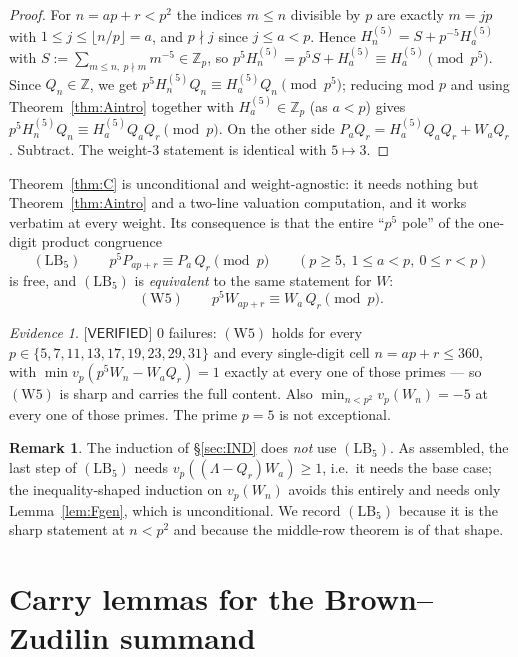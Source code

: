 \documentclass[11pt,reqno]{amsart}
\theoremstyle{plain}
\theoremstyle{definition}
\newtheorem{remark}[theorem]{Remark}
\theoremstyle{remark}
\newtheorem{evidence}[theorem]{Evidence}
\numberwithin{equation}{section}
\newcommand{\ZZ}{\mathbb{Z}}
\newcommand{\Zp}{\ZZ_p}
\newcommand{\VERIFIED}{\textsf{[VERIFIED]}}
\begin{document}
\begin{proof}
For $n=ap+r<p^2$ the indices $m\le n$ divisible by $p$ are exactly $m=jp$ with
$1\le j\le\lfloor n/p\rfloor=a$, and $p\nmid j$ since $j\le a<p$. Hence
$H^{(5)}_n=S+p^{-5}H^{(5)}_a$ with $S:=\sum_{m\le n,\ p\nmid m}m^{-5}\in\Zp$, so
$p^5H^{(5)}_n=p^5S+H^{(5)}_a\equiv H^{(5)}_a\pmod{p^5}$. Since $Q_n\in\ZZ$, we get
$p^5H^{(5)}_nQ_n\equiv H^{(5)}_aQ_n\pmod{p^5}$; reducing mod $p$ and using
Theorem~\ref{thm:Aintro} together with $H^{(5)}_a\in\Zp$ (as $a<p$) gives
$p^5H^{(5)}_nQ_n\equiv H^{(5)}_aQ_aQ_r\pmod p$. On the other side
$P_aQ_r=H^{(5)}_aQ_aQ_r+W_aQ_r$. Subtract. The weight-$3$ statement is identical with
$5\mapsto3$.
\end{proof}

Theorem~\ref{thm:C} is unconditional and weight-agnostic: it needs nothing but
Theorem~\ref{thm:Aintro} and a two-line valuation computation, and it works verbatim at every
weight. Its consequence is that the entire ``$p^5$ pole'' of the one-digit product congruence
\[
(\mathrm{LB}_5)\qquad p^5P_{ap+r}\equiv P_a\,Q_r\pmod p\qquad(p\ge5,\ 1\le a<p,\ 0\le r<p)
\]
is free, and $(\mathrm{LB}_5)$ is \emph{equivalent} to the same statement for $W$:
\[
(\mathrm{W}5)\qquad p^5W_{ap+r}\equiv W_a\,Q_r\pmod p .
\]

\begin{evidence}\label{ev:W5}
$\VERIFIED$ $0$ failures: $(\mathrm{W}5)$ holds for every $p\in\{5,7,11,13,17,19,23,29,31\}$ and
every single-digit cell $n=ap+r\le360$, with
$\min v_p(p^5W_n-W_aQ_r)=1$ exactly at every one of those primes --- so $(\mathrm{W}5)$ is
sharp and carries the full content. Also $\min_{n<p^2}v_p(W_n)=-5$ at every one of those
primes. The prime $p=5$ is not exceptional.
\end{evidence}

\begin{remark}
The induction of \S\ref{sec:IND} does \emph{not} use $(\mathrm{LB}_5)$. As assembled, the last
step of $(\mathrm{LB}_5)$ needs $v_p((\Lambda-Q_r)W_a)\ge1$, i.e.\ it needs the base case; the
inequality-shaped induction on $v_p(W_n)$ avoids this entirely and needs only
Lemma~\ref{lem:Fgen}, which is unconditional. We record $(\mathrm{LB}_5)$ because it is the
sharp statement at $n<p^2$ and because the middle-row theorem is of that shape.
\end{remark}

\section{Carry lemmas for the Brown--Zudilin summand}\label{sec:carry}
\end{document}
